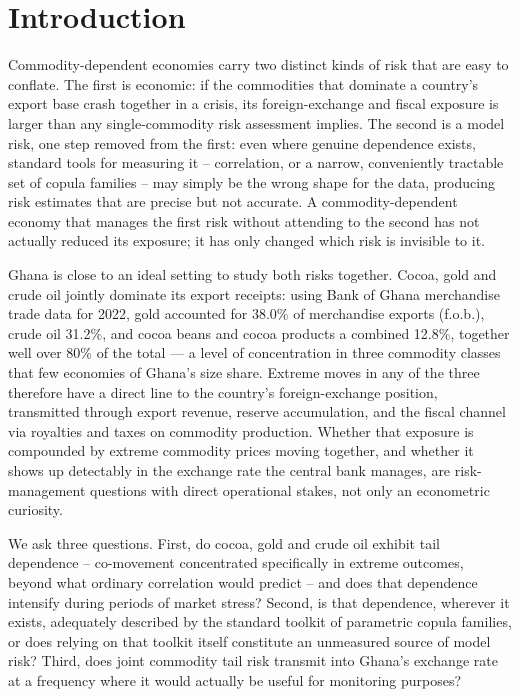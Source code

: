 \documentclass[final,3p,times,authoryear]{elsarticle}
\begin{document}
\section{Introduction}
\label{sec:intro}

Commodity-dependent economies carry two distinct kinds of risk that are
easy to conflate. The first is economic: if the commodities that
dominate a country's export base crash together in a crisis, its
foreign-exchange and fiscal exposure is larger than any single-commodity
risk assessment implies. The second is a model risk, one step removed
from the first: even where genuine dependence exists, standard tools
for measuring it -- correlation, or a narrow, conveniently tractable set
of copula families -- may simply be the wrong shape for the data,
producing risk estimates that are precise but not accurate. A
commodity-dependent economy that manages the first risk without
attending to the second has not actually reduced its exposure; it has
only changed which risk is invisible to it.

Ghana is close to an ideal setting to study both risks together. Cocoa,
gold and crude oil jointly dominate its export receipts: using Bank of
Ghana merchandise trade data for 2022, gold accounted for 38.0\% of
merchandise exports (f.o.b.), crude oil 31.2\%, and cocoa beans and
cocoa products a combined 12.8\%, together well over 80\% of the total
--- a level of concentration in three commodity classes that few
economies of Ghana's size share. Extreme moves in any of the three
therefore have a direct line to the country's foreign-exchange position,
transmitted through export revenue, reserve accumulation, and the fiscal
channel via royalties and taxes on commodity production. Whether that
exposure is compounded by extreme commodity prices moving together, and
whether it shows up detectably in the exchange rate the central bank
manages, are risk-management questions with direct operational stakes,
not only an econometric curiosity.

We ask three questions. First, do cocoa, gold and crude oil exhibit
tail dependence -- co-movement concentrated specifically in extreme
outcomes, beyond what ordinary correlation would predict -- and does
that dependence intensify during periods of market stress? Second, is
that dependence, wherever it exists, adequately described by the
standard toolkit of parametric copula families, or does relying on that
toolkit itself constitute an unmeasured source of model risk? Third,
does joint commodity tail risk transmit into Ghana's exchange rate at a
frequency where it would actually be useful for monitoring purposes?
\end{document}
